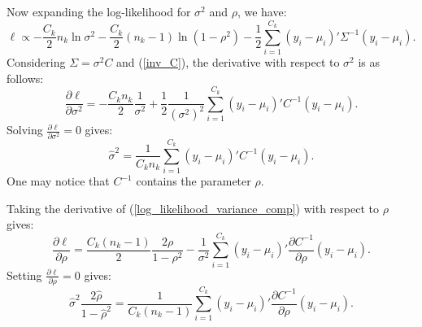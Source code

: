 \documentclass[11pt,a5paper,twoside]{book}
\begin{document}
{Now expanding the log-likelihood for $\sigma^2$ and $\rho$, we have:
\begin{equation}
\label{log_likelihood_variance_comp}
\ell \propto -\frac{C_k}{2}n_k \ln\sigma^2 - \frac{C_k}{2} (n_k-1) \ln (1-\rho^2) -\frac{1}{2}\sum_{i=1}^{C_k} (y_i-\mu_i)' \Sigma^{-1} (y_i-\mu_i).
\end{equation}
Considering $\Sigma=\sigma^2 C$ and (\ref{inv_C}), the derivative with respect to $\sigma^2$ is as follows:
\begin{equation}
\label{derivative_sigma_2}
\frac{\partial \ell}{\partial \sigma^2} = -\frac{C_kn_k}{2} \frac{1}{\sigma^2} +\frac{1}{2}\frac{1}{(\sigma^2)^2}\sum_{i=1}^{C_k} (y_i-\mu_i)' C^{-1} (y_i-\mu_i).
\end{equation}
Solving
$\frac{\partial \ell}{\partial \sigma^2} =0$ gives:
\begin{equation}
\label{sigma_2_hat1}
\widehat{\sigma}^2=\frac{1}{C_kn_k}\sum_{i=1}^{C_k} (y_i-\mu_i)' C^{-1} (y_i-\mu_i).
\end{equation}
One may notice that $C^{-1}$ contains the parameter $\rho$.

Taking the derivative of (\ref{log_likelihood_variance_comp}) with respect to $\rho$ gives:
\begin{equation}
\label{derivative_rho}
\frac{\partial \ell}{\partial \rho} =\frac{C_k (n_k-1)}{2}\frac{2\rho}{1-\rho^2} -\frac{1}{\sigma^2}\sum_{i=1}^{C_k} (y_i-\mu_i)' \frac{\partial C^{-1}}{\partial \rho} (y_i-\mu_i).
\end{equation}
Setting $\frac{\partial \ell}{\partial \rho} =0$ gives:
\begin{equation}
\label{rho_hat1}
\widehat{\sigma}^2 \frac{2\widehat{\rho}}{1-\widehat{\rho}^2} = \frac{1}{C_k (n_k-1)} \sum_{i=1}^{C_k} (y_i-\mu_i)' \frac{\partial C^{-1}}{\partial \rho}  (y_i-\mu_i).
\end{equation}

}
\end{document}
